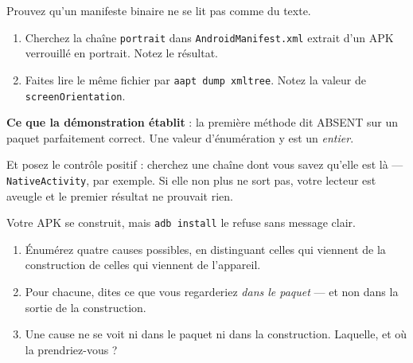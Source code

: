 \begin{nkdemo}
Prouvez qu'un manifeste binaire ne se lit pas comme du texte.

\begin{enumerate}
\item Cherchez la chaîne \texttt{portrait} dans \texttt{AndroidManifest.xml}
      extrait d'un APK verrouillé en portrait. Notez le résultat.
\item Faites lire le même fichier par \texttt{aapt dump xmltree}. Notez la valeur
      de \texttt{screenOrientation}.
\end{enumerate}

\textbf{Ce que la démonstration établit} : la première méthode dit ABSENT sur un
paquet parfaitement correct. Une valeur d'énumération y est un \emph{entier}.

\alerte{} Et posez le contrôle positif : cherchez une chaîne dont vous savez qu'elle est
là --- \texttt{NativeActivity}, par exemple. Si elle non plus ne sort pas, votre
lecteur est aveugle et le premier résultat ne prouvait rien.
\end{nkdemo}

\begin{nklogique}
Votre APK se construit, mais \texttt{adb install} le refuse sans message clair.

\begin{enumerate}
\item Énumérez quatre causes possibles, en distinguant celles qui viennent de la
      construction de celles qui viennent de l'appareil.
\item Pour chacune, dites ce que vous regarderiez \emph{dans le paquet} --- et
      non dans la sortie de la construction.
\item Une cause ne se voit ni dans le paquet ni dans la construction. Laquelle,
      et où la prendriez-vous ?
\end{enumerate}
\end{nklogique}
